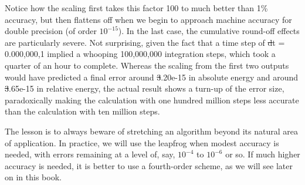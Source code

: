Notice how the scaling first takes this factor 100 to much better than
1\% accuracy, but then flattens off when we begin to approach machine
accuracy for double precision (of order $10^{-15}$).  In the last
case, the cumulative round-off effects are particularly severe.  Not
surprising, given the fact that a time step of {\st dt = 0.000,000,1}
implied a whooping 100,000,000 integration steps, which took a quarter
of an hour to complete.  Whereas the scaling from the first two
outputs would have predicted a final error around {\st 3.20e-15} in
absolute energy and around {\st 3.65e-15} in relative energy, the
actual result shows a turn-up of the error size, paradoxically making
the calculation with one hundred million steps less accurate than the
calculation with ten million steps.

The lesson is to always beware of stretching an algorithm beyond its
natural area of application.  In practice, we will use the leapfrog
when modest accuracy is needed, with errors remaining at a level of,
say, $10^{-4}$ to $10^{-6}$ or so.  If much higher accuracy is needed,
it is better to use a fourth-order scheme, as we will see later on in
this book.
